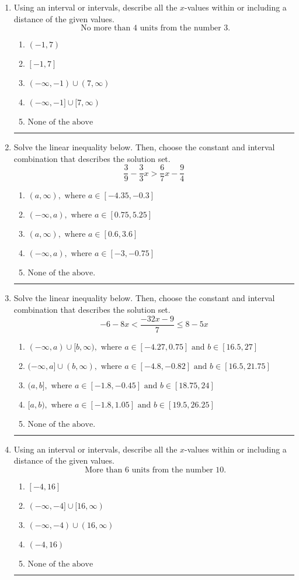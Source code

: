 \documentclass[14pt]{extbook}
\newcommand{\litem}[1]{\item#1\hspace*{-1cm}\rule{\textwidth}{0.4pt}}
\begin{document}
\begin{enumerate}
\litem{
Using an interval or intervals, describe all the $x$-values within or including a distance of the given values.\[ \text{ No more than } 4 \text{ units from the number } 3. \]\begin{enumerate}[label=\Alph*.]
\item \( (-1, 7) \)
\item \( [-1, 7] \)
\item \( (-\infty, -1) \cup (7, \infty) \)
\item \( (-\infty, -1] \cup [7, \infty) \)
\item \( \text{None of the above} \)

\end{enumerate} }
\litem{
Solve the linear inequality below. Then, choose the constant and interval combination that describes the solution set.\[ \frac{3}{9} - \frac{3}{3} x > \frac{6}{7} x - \frac{9}{4} \]\begin{enumerate}[label=\Alph*.]
\item \( (a, \infty), \text{ where } a \in [-4.35, -0.3] \)
\item \( (-\infty, a), \text{ where } a \in [0.75, 5.25] \)
\item \( (a, \infty), \text{ where } a \in [0.6, 3.6] \)
\item \( (-\infty, a), \text{ where } a \in [-3, -0.75] \)
\item \( \text{None of the above}. \)

\end{enumerate} }
\litem{
Solve the linear inequality below. Then, choose the constant and interval combination that describes the solution set.\[ -6 - 8 x < \frac{-32 x - 9}{7} \leq 8 - 5 x \]\begin{enumerate}[label=\Alph*.]
\item \( (-\infty, a) \cup [b, \infty), \text{ where } a \in [-4.27, 0.75] \text{ and } b \in [16.5, 27] \)
\item \( (-\infty, a] \cup (b, \infty), \text{ where } a \in [-4.8, -0.82] \text{ and } b \in [16.5, 21.75] \)
\item \( (a, b], \text{ where } a \in [-1.8, -0.45] \text{ and } b \in [18.75, 24] \)
\item \( [a, b), \text{ where } a \in [-1.8, 1.05] \text{ and } b \in [19.5, 26.25] \)
\item \( \text{None of the above.} \)

\end{enumerate} }
\litem{
Using an interval or intervals, describe all the $x$-values within or including a distance of the given values.\[ \text{ More than } 6 \text{ units from the number } 10. \]\begin{enumerate}[label=\Alph*.]
\item \( [-4, 16] \)
\item \( (-\infty, -4] \cup [16, \infty) \)
\item \( (-\infty, -4) \cup (16, \infty) \)
\item \( (-4, 16) \)
\item \( \text{None of the above} \)


\end{enumerate}}
\end{enumerate}
\end{document}
